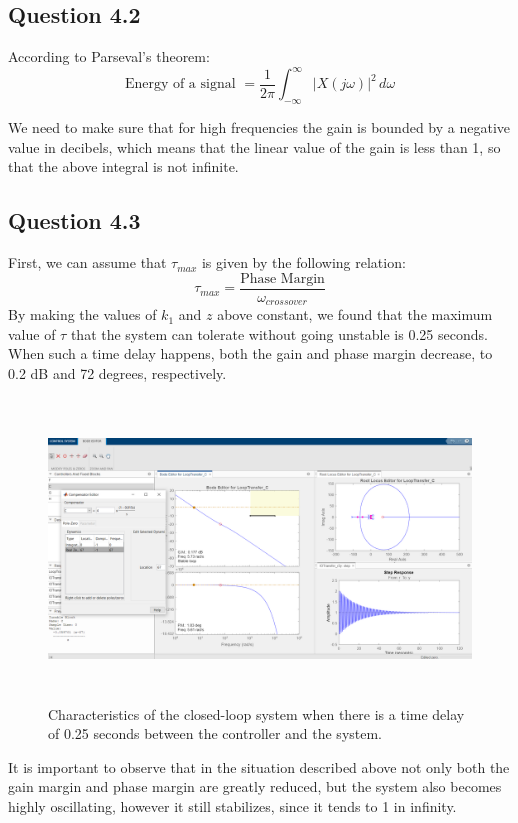 \documentclass[a4paper,8pt]{extarticle}
\begin{document}
        \subsection*{Question 4.2}
        According to Parseval's theorem:
        \begin{equation}
        \text{Energy of a signal }= \frac{1}{2\pi}\int_{-\infty}^{\infty}
        |X(j\omega)|^2 \,d\omega
        \end{equation}
        
        We need to make sure that for high frequencies the gain is bounded by a negative value in decibels, which means that the linear value of the gain is less than 1, so that the above integral is not infinite.
        \clearpage
        \subsection*{Question 4.3}
        First, we can assume that $\tau_{max}$ is given by the following relation:\\
        \begin{equation}
            \tau_{max}=\frac{\text{Phase Margin}}{\omega_{crossover}}
        \end{equation}
        By making the values of $k_{1}$ and $z$  above constant, we found that the maximum value of $\tau$ that the system can tolerate without going unstable is 0.25 seconds. When such a time delay happens, both the gain and phase margin decrease, to 0.2 dB and 72 degrees, respectively.
        \begin{figure}[H]
            \centering
            \captionsetup{justification=centering,margin=2cm}
            \includegraphics[width=15cm,height=8cm]{Screenshot (345).png} 
            \caption{Characteristics of the closed-loop system when there is a time delay of 0.25 seconds between the controller and the system.}
        \end{figure}
        It is important to observe that in the situation described above not only both the gain margin and phase margin are greatly reduced, but the system also becomes highly oscillating, however it still stabilizes, since it tends to 1 in infinity.
        \clearpage
        
\end{document}
